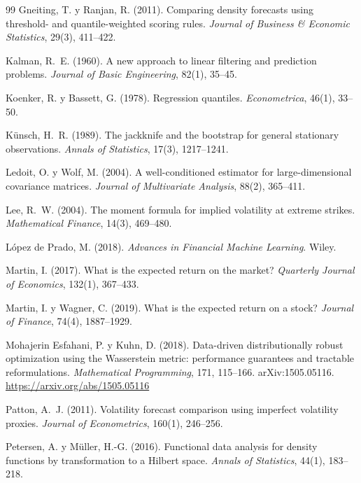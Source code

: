 \begin{thebibliography}{99}
Gneiting, T. y Ranjan, R. (2011). Comparing density forecasts using threshold- and quantile-weighted
scoring rules. \emph{Journal of Business \& Economic Statistics}, 29(3), 411--422.

Kalman, R.~E. (1960). A new approach to linear filtering and prediction problems. \emph{Journal of Basic
Engineering}, 82(1), 35--45.

Koenker, R. y Bassett, G. (1978). Regression quantiles. \emph{Econometrica}, 46(1), 33--50.

Künsch, H.~R. (1989). The jackknife and the bootstrap for general stationary observations. \emph{Annals of
Statistics}, 17(3), 1217--1241.

Ledoit, O. y Wolf, M. (2004). A well-conditioned estimator for large-dimensional covariance matrices.
\emph{Journal of Multivariate Analysis}, 88(2), 365--411.

Lee, R.~W. (2004). The moment formula for implied volatility at extreme strikes. \emph{Mathematical
Finance}, 14(3), 469--480.

López de Prado, M. (2018). \emph{Advances in Financial Machine Learning}. Wiley.

Martin, I. (2017). What is the expected return on the market? \emph{Quarterly Journal of Economics},
132(1), 367--433.

Martin, I. y Wagner, C. (2019). What is the expected return on a stock? \emph{Journal of Finance}, 74(4),
1887--1929.

Mohajerin Esfahani, P. y Kuhn, D. (2018). Data-driven distributionally robust optimization using the
Wasserstein metric: performance guarantees and tractable reformulations. \emph{Mathematical Programming},
171, 115--166. arXiv:1505.05116. \url{https://arxiv.org/abs/1505.05116}

Patton, A.~J. (2011). Volatility forecast comparison using imperfect volatility proxies. \emph{Journal of
Econometrics}, 160(1), 246--256.

Petersen, A. y Müller, H.-G. (2016). Functional data analysis for density functions by transformation to a
Hilbert space. \emph{Annals of Statistics}, 44(1), 183--218.


\end{thebibliography}
